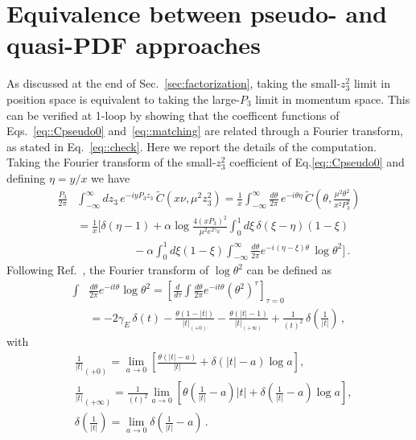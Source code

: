 \section{Equivalence between pseudo- and quasi-PDF approaches}
\label{app:check}

As discussed at the end of Sec.~\ref{sec:factorization}, taking the
small-$z_3^2$ limit in position space is equivalent to taking the large-$P_3$
limit in momentum space. This can be verified at 1-loop by showing that the
coefficent functions of Eqs.~\eqref{eq::Cpseudo0} and~\eqref{eq::matching} are
related through a Fourier transform, as stated in Eq.~\eqref{eq::check}. Here we
report the details of the computation. Taking the Fourier transform of the
small-$z_3^2$ coefficient of Eq.\eqref{eq::Cpseudo0} and defining $\eta= y/x$ we
have 
\begin{align}
    \label{eq::checkapp}
	\frac{P_3}{2\pi}&\int_{-\infty}^{\infty} dz_3\, e^{-i y P_3 z_3 }\,
	\tilde{C}\left(x\nu, \mu^2 z_3^2 \right) = 
    \frac{1}{x}\int_{-\infty}^{\infty}\frac{d\theta}{2\pi}\, e^{-i\theta\eta}\,
	\tilde{C}\left(\theta, \frac{\mu^2\theta^2}{x^2 P_3^2} \right) \nonumber \\
    & = \frac{1}{x}\biggl[\delta\left(\eta-1\right) 
    +\alpha\log\frac{4 \left(xP_3\right)^2}{\mu^2 e^{2\gamma_E}}\int_0^1 d\xi\,
    \delta\left(\xi-\eta\right)\left(1-\xi\right) \nonumber \\
    &\,\,\,\,\,\,\,\,\,\,\,\,\,\,\,\,\,\,\,\,\,\,\,\,\,\,\,\,\,\,
    -\alpha\int_0^1 d\xi \left(1-\xi\right)\int_{-\infty}^{\infty} \frac{d\theta}{2\pi} 
    e^{-i \left(\eta-\xi\right) \theta} \,\log\theta^2\biggr]\, .
\end{align}
Following Ref.~\cite{Izubuchi:2018srq}, the Fourier transform of $\log\theta^2$
can be defined as
\begin{align}
    \label{eq::FTlog}
    \int& \frac{d\theta}{2\pi} e^{-i t \theta} \log \theta^2
    = \left[\frac{d}{d\tau} \int \frac{d\theta}{2\pi} e^{-it \theta} 
    \left(\theta^2\right)^{\tau}\right]_{\tau=0} \nonumber\\
    &= -2 \gamma_E \, \delta\left(t\right) - \frac{\theta\left(1 - |t|\right)}{|t|_{\left(+0\right)}}
    - \frac{\theta\left(|t| -1\right)}{|t|_{\left(+\infty\right)}}
    + \frac{1}{\left(t\right)^2}\,\delta\left(\frac{1}{|t|}\right)\, ,
\end{align}
with
\begin{align}
    \label{eq::distribution1}
    &\frac{1}{|t|}_{\left(+0\right)} 
    = \lim_{a\rightarrow 0}
    \left[\frac{\theta\left(|t|-a\right)}{|t|} +  \delta\left(|t|-a\right)\log a\right], \\
    &\frac{1}{|t|}_{\left(+\infty\right)} 
    = \frac{1}{\left(t\right)^2}\lim_{a\rightarrow 0}
    \left[\theta\left(\frac{1}{|t|}-a\right)|t| + \delta\left(\frac{1}{|t|}-a\right)\log a\right], \\
    &\delta\left(\frac{1}{|t|}\right) = \lim_{a\rightarrow 0}\delta\left(\frac{1}{|t|} - a\right)\, .
\end{align}
